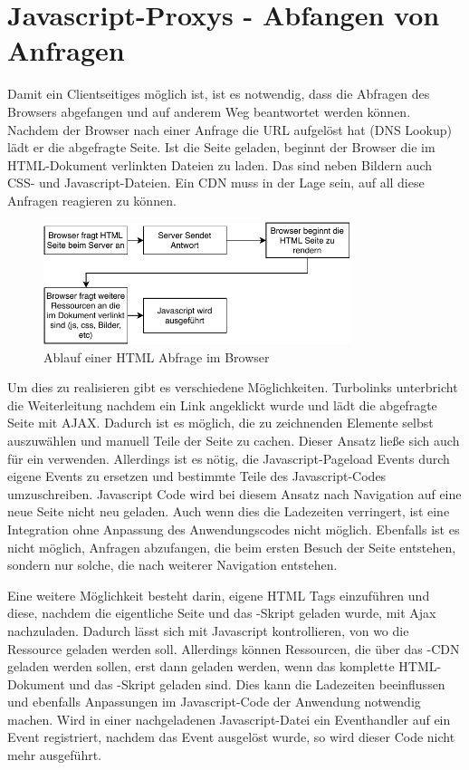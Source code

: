 \section{Javascript-Proxys - Abfangen von Anfragen}\label{k:jsProxies}



Damit ein Clientseitiges \cdn möglich ist, ist es notwendig, dass die Abfragen des Browsers abgefangen und auf anderem Weg beantwortet werden können. Nachdem der Browser nach einer Anfrage die URL aufgelöst hat (DNS Lookup) lädt er die abgefragte Seite. Ist die Seite geladen, beginnt der Browser die im HTML-Dokument verlinkten Dateien zu laden. Das sind neben Bildern auch CSS- und Javascript-Dateien. Ein CDN muss in der Lage sein, auf all diese Anfragen reagieren zu können.

\begin{figure}[!h]
	\centering
	\includegraphics[width=0.8\textwidth]{figures/browser_abfrage}
	\caption[Ablauf einer HTML Abfrage im Browser]{Ablauf einer HTML Abfrage im Browser}
	\label{fig:browser_abfrage}
\end{figure}


Um dies zu realisieren gibt es verschiedene Möglichkeiten. Turbolinks unterbricht die Weiterleitung nachdem ein Link angeklickt wurde und lädt die abgefragte Seite mit AJAX. Dadurch ist es möglich, die zu zeichnenden Elemente selbst auszuwählen und manuell Teile der Seite zu cachen. Dieser Ansatz ließe sich auch für ein \cdn verwenden. Allerdings ist es nötig, die Javascript-Pageload Events durch eigene Events zu ersetzen und bestimmte Teile des Javascript-Codes umzuschreiben. Javascript Code wird bei diesem Ansatz nach Navigation auf eine neue Seite nicht neu geladen. Auch wenn dies die Ladezeiten verringert, ist eine Integration ohne Anpassung des Anwendungscodes nicht möglich. Ebenfalls ist es nicht möglich, Anfragen abzufangen, die beim ersten Besuch der Seite entstehen, sondern nur solche, die nach weiterer Navigation entstehen.

Eine weitere Möglichkeit besteht darin, eigene HTML Tags einzuführen und diese, nachdem die eigentliche Seite und das \cdn-Skript geladen wurde, mit Ajax nachzuladen. Dadurch lässt sich mit Javascript kontrollieren, von wo die Ressource geladen werden soll. Allerdings können Ressourcen, die über das \pTp-CDN geladen werden sollen, erst dann geladen werden, wenn das komplette HTML-Dokument und das \cdn-Skript geladen sind. Dies kann die Ladezeiten beeinflussen und ebenfalls Anpassungen im Javascript-Code der Anwendung notwendig machen. Wird in einer nachgeladenen Javascript-Datei ein Eventhandler auf ein Event registriert, nachdem das Event ausgelöst wurde, so wird dieser Code nicht mehr ausgeführt.

